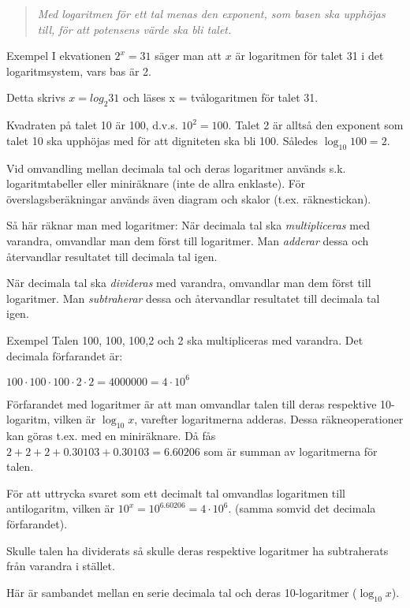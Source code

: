 \begin{quote}\emph{
Med logaritmen för ett tal menas den exponent, som basen ska upphöjas till,
för att potensens värde ska bli talet.
}\end{quote}

Exempel
I ekvationen \(2^x = 31\) säger man att \(x\) är logaritmen för talet 31 i det
logaritmsystem, vars bas är 2.

Detta skrivs \(x= log_2 31\) och läses x = tvålogaritmen för talet 31.

Kvadraten på talet 10 är 100, d.v.s. \(10^2 = 100\). Talet 2 är alltså den
exponent som talet 10 ska upphöjas med för att digniteten ska bli 100.
Således \(\log_{10}{100} = 2\).

Vid omvandling mellan decimala tal och deras logaritmer används s.k.
logaritmtabeller eller miniräknare (inte de allra enklaste). För
överslagsberäkningar används även diagram och skalor (t.ex. räknestickan).

Så här räknar man med logaritmer:
När decimala tal ska \emph{multipliceras} med varandra, omvandlar man dem
först till logaritmer. Man \emph{adderar} dessa och återvandlar resultatet till
decimala tal igen.

När decimala tal ska \emph{divideras} med varandra, omvandlar man dem först
till logaritmer. Man \emph{subtraherar} dessa och återvandlar resultatet till
decimala tal igen.

Exempel
Talen 100, 100, 100,2 och 2 ska multipliceras med varandra.
Det decimala förfarandet är:

\(100 \cdot 100 \cdot 100 \cdot 2 \cdot 2 = 4000000 = 4 \cdot 10^6\)

Förfarandet med logaritmer är att man omvandlar talen till deras respektive
10-logaritm, vilken är \(\log_{10} x\), varefter logaritmerna adderas. Dessa
räkneoperationer kan göras t.ex. med en miniräknare. Då fås
\(2 + 2 + 2 + 0.30103 + 0.30103 = 6.60206\) som är summan av logaritmerna för
talen.

För att uttrycka svaret som ett decimalt tal omvandlas logaritmen till
antilogaritm, vilken är \(10^x = 10^{6.60206} = 4 \cdot 10^6\).
(samma somvid det decimala förfarandet).

Skulle talen ha dividerats så skulle deras respektive logaritmer ha subtraherats
från varandra i stället.

Här är sambandet mellan en serie decimala tal och deras 10-logaritmer (\(\log_{10} x\)).

